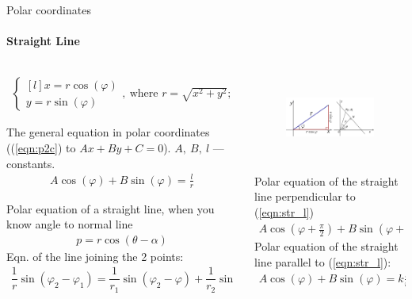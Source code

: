 \documentclass[aspectratio=169]{beamer}
\begin{document}
\begin{frame}[t]{Polar coordinates}
\framesubtitle{Straight Line}
\scriptsize
\begin{columns}[T,onlytextwidth]
    \begin{column}{0.49\textwidth}
        \vspace{-0.4cm}
        \begin{align}
            \label{eqn:p2c}
            \left\{\begin{matrix*}[l]
            x = r \cos(\varphi)\\ 
            y = r \sin(\varphi)
            \end{matrix*}\right. ,\ \text{where }
                r = \sqrt{x^2+y^2};
        \end{align} \smallskip

    The general equation in polar coordinates ((\ref{eqn:p2c}) to $Ax+By+C=0$). $A,\ B,\ l$ --- constants.
    \begin{align}
        \label{eqn:str_l}
        A\cos(\varphi)+B\sin(\varphi) = \frac{l}{r}
    \end{align} 

    Polar equation of a straight line, when you know angle to normal line
    \begin{align}
        \label{eqn:str_l_normal}
        p=r\cos(\theta-\alpha)
    \end{align}
    Eqn. of the line joining the 2 points:
    \begin{align*}
        \dfrac{1}{r}\sin(\varphi_2-\varphi_1)=\dfrac{1}{r_1}\sin({\varphi_2-\varphi}) + \dfrac{1}{r_2}\sin({\varphi-\varphi_1})
    \end{align*}
    \end{column}
    \begin{column}{0.49\textwidth}
        \vspace{-0.8cm}
        \begin{figure}[H]
            \centering\includegraphics[height=2.8cm,width=1\textwidth,keepaspectratio]{polar_to_cart.png}
            \label{fig:polar_to_cart.png}
        \end{figure}
        \vspace{-0.5cm}
        Polar equation of the straight line perpendicular to (\ref{eqn:str_l})
        \begin{align}
            \label{eqn:str_l_perp}
            A\cos(\varphi+\frac{\pi}{2}) + B\sin(\varphi+\frac{\pi}{2})=k\frac{l}{r}
        \end{align}
        Polar equation of the straight line parallel to (\ref{eqn:str_l}):
        \begin{align}
            A\cos(\varphi) + B\sin(\varphi)=k\frac{l}{r}
        \end{align}
    \end{column}
\end{columns}
\end{frame}
\end{document}
